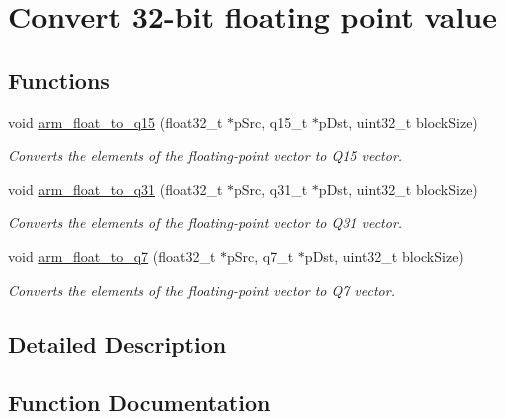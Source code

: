 \hypertarget{group__float__to__x}{}\section{Convert 32-\/bit floating point value}
\label{group__float__to__x}
\subsection*{Functions}
\begin{DoxyCompactItemize}
\item 
void \hyperlink{group__float__to__x_ga215456e35a18db86882e1d3f0d24e1f2}{arm\+\_\+float\+\_\+to\+\_\+q15} (float32\+\_\+t $\ast$p\+Src, q15\+\_\+t $\ast$p\+Dst, uint32\+\_\+t block\+Size)
\begin{DoxyCompactList}\small\item\em Converts the elements of the floating-\/point vector to Q15 vector. \end{DoxyCompactList}\item 
void \hyperlink{group__float__to__x_ga177704107f94564e9abe4daaa36f4554}{arm\+\_\+float\+\_\+to\+\_\+q31} (float32\+\_\+t $\ast$p\+Src, q31\+\_\+t $\ast$p\+Dst, uint32\+\_\+t block\+Size)
\begin{DoxyCompactList}\small\item\em Converts the elements of the floating-\/point vector to Q31 vector. \end{DoxyCompactList}\item 
void \hyperlink{group__float__to__x_ga44a393818cdee8dce80f2d66add25411}{arm\+\_\+float\+\_\+to\+\_\+q7} (float32\+\_\+t $\ast$p\+Src, q7\+\_\+t $\ast$p\+Dst, uint32\+\_\+t block\+Size)
\begin{DoxyCompactList}\small\item\em Converts the elements of the floating-\/point vector to Q7 vector. \end{DoxyCompactList}\end{DoxyCompactItemize}


\subsection{Detailed Description}


\subsection{Function Documentation}
